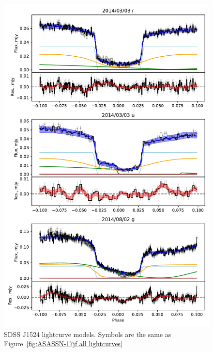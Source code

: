 \begin{figure}
    \centering
    \includegraphics[width=\textwidth]{figures/results/SDSS1524/SDSS1524_1.pdf}
    \caption{SDSS J1524 lightcurve models. Symbols are the same as Figure~\ref{fig:ASASSN-17jf all lightcurves}}
    \label{fig:SDSS1524 all lightcurves}
\end{figure}
